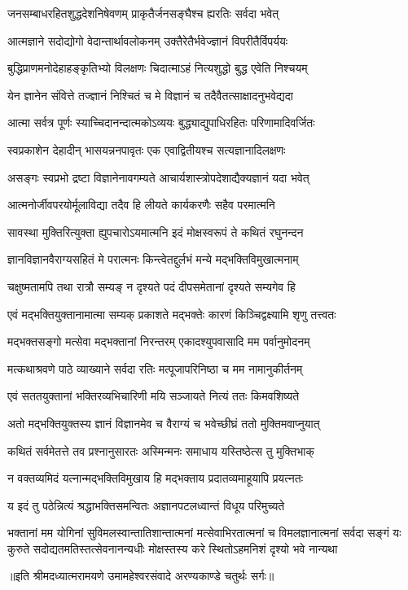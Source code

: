 \twolineshloka
{जनसम्बाधरहितशुद्धदेशनिषेवणम्}
{प्राकृतैर्जनसङ्घैश्च ह्यरतिः सर्वदा भवेत्} %

\twolineshloka
{आत्मज्ञाने सदोद्योगो वेदान्तार्थावलोकनम्}
{उक्तैरेतैर्भवेज्ज्ञानं विपरीतैर्विपर्ययः} %

\twolineshloka
{बुद्धिप्राणमनोदेहाहङ्कृतिभ्यो विलक्षणः}
{चिदात्माऽहं नित्यशुद्धो बुद्ध एवेति निश्चयम्} %

\twolineshloka
{येन ज्ञानेन संवित्ते तज्ज्ञानं निश्चितं च मे}
{विज्ञानं च तदैवैतत्साक्षादनुभवेद्यदा} %

\twolineshloka
{आत्मा सर्वत्र पूर्णः स्याच्चिदानन्दात्मकोऽव्ययः}
{बुद्ध्याद्युपाधिरहितः परिणामादिवर्जितः} %

\twolineshloka
{स्वप्रकाशेन देहादीन् भासयन्ननपावृतः}
{एक एवाद्वितीयश्च सत्यज्ञानादिलक्षणः} %

\twolineshloka
{असङ्गः स्वप्रभो द्रष्टा विज्ञानेनावगम्यते}
{आचार्यशास्त्रोपदेशाद्यैक्यज्ञानं यदा भवेत्} %

\twolineshloka
{आत्मनोर्जीवपरयोर्मूलाविद्या तदैव हि}
{लीयते कार्यकरणैः सहैव परमात्मनि} %

\twolineshloka
{सावस्था मुक्तिरित्युक्ता ह्युपचारोऽयमात्मनि}
{इदं मोक्षस्वरूपं ते कथितं रघुनन्दन} %

\twolineshloka
{ज्ञानविज्ञानवैराग्यसहितं मे परात्मनः}
{किन्त्वेतद्दुर्लभं मन्ये मद्भक्तिविमुखात्मनाम्} %

\twolineshloka
{चक्षुष्मतामपि तथा रात्रौ सम्यङ् न दृश्यते}
{पदं दीपसमेतानां दृश्यते सम्यगेव हि} %

\twolineshloka
{एवं मद्भक्तियुक्तानामात्मा सम्यक् प्रकाशते}
{मद्भक्तेः कारणं किञ्चिद्वक्ष्यामि शृणु तत्त्वतः} %

\twolineshloka
{मद्भक्तसङ्गो मत्सेवा मद्भक्तानां निरन्तरम्}
{एकादश्युपवासादि मम पर्वानुमोदनम्} %

\twolineshloka
{मत्कथाश्रवणे पाठे व्याख्याने सर्वदा रतिः}
{मत्पूजापरिनिष्ठा च मम नामानुकीर्तनम्} %

\twolineshloka
{एवं सततयुक्तानां भक्तिरव्यभिचारिणी}
{मयि सञ्जायते नित्यं ततः किमवशिष्यते} %

\twolineshloka
{अतो मद्भक्तियुक्तस्य ज्ञानं विज्ञानमेव च}
{वैराग्यं च भवेच्छीघ्रं ततो मुक्तिमवाप्नुयात्} %

\twolineshloka
{कथितं सर्वमेतत्ते तव प्रश्नानुसारतः}
{अस्मिन्मनः समाधाय यस्तिष्ठेत्स तु मुक्तिभाक्} %

\twolineshloka
{न वक्तव्यमिदं यत्नान्मद्भक्तिविमुखाय हि}
{मद्भक्ताय प्रदातव्यमाहूयापि प्रयत्नतः} %

\twolineshloka
{य इदं तु पठेन्नित्यं श्रद्धाभक्तिसमन्वितः}
{अज्ञानपटलध्वान्तं विधूय परिमुच्यते} %

\fourlineindentedshloka
{भक्तानां मम योगिनां सुविमलस्वान्तातिशान्तात्मनां}
{मत्सेवाभिरतात्मनां च विमलज्ञानात्मनां सर्वदा}
{सङ्गं यः कुरुते सदोद्यतमतिस्तत्सेवनानन्यधीः}
{मोक्षस्तस्य करे स्थितोऽहमनिशं दृश्यो भवे नान्यथा} %

{॥इति श्रीमदध्यात्मरामयणे उमामहेश्वरसंवादे
अरण्यकाण्डे चतुर्थः सर्गः॥}
